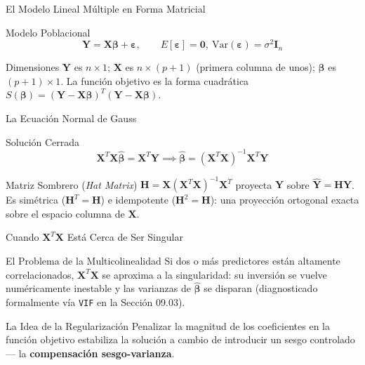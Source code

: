 \documentclass[10pt, aspectratio=169]{beamer}
\begin{document}
\begin{frame}{El Modelo Lineal Múltiple en Forma Matricial}
  \footnotesize
  \begin{block}{Modelo Poblacional}
    $$\mathbf{Y}=\mathbf{X}\boldsymbol\beta+\boldsymbol\varepsilon, \qquad E[\boldsymbol\varepsilon]=\mathbf{0},\ \text{Var}(\boldsymbol\varepsilon)=\sigma^2\mathbf{I}_n$$
  \end{block}
  \pause

  \vspace{0.1cm}
  \begin{alertblock}{Dimensiones}
    $\mathbf{Y}$ es $n\times1$; $\mathbf{X}$ es $n\times(p+1)$ (primera columna de unos); $\boldsymbol\beta$ es $(p+1)\times1$. La función objetivo es la forma cuadrática $S(\boldsymbol\beta)=(\mathbf{Y}-\mathbf{X}\boldsymbol\beta)^T(\mathbf{Y}-\mathbf{X}\boldsymbol\beta)$.
  \end{alertblock}
\end{frame}

\begin{frame}{La Ecuación Normal de Gauss}
  \footnotesize
  \begin{block}{Solución Cerrada}
    $$\mathbf{X}^T\mathbf{X}\hat{\boldsymbol\beta}=\mathbf{X}^T\mathbf{Y} \implies \hat{\boldsymbol\beta}=(\mathbf{X}^T\mathbf{X})^{-1}\mathbf{X}^T\mathbf{Y}$$
  \end{block}
  \pause

  \vspace{0.1cm}
  \begin{alertblock}{Matriz Sombrero (\emph{Hat Matrix})}
    $\mathbf{H}=\mathbf{X}(\mathbf{X}^T\mathbf{X})^{-1}\mathbf{X}^T$ proyecta $\mathbf{Y}$ sobre $\hat{\mathbf{Y}}=\mathbf{H}\mathbf{Y}$. Es simétrica ($\mathbf{H}^T=\mathbf{H}$) e idempotente ($\mathbf{H}^2=\mathbf{H}$): una proyección ortogonal exacta sobre el espacio columna de $\mathbf{X}$.
  \end{alertblock}
\end{frame}

\begin{frame}{Cuando $\mathbf{X}^T\mathbf{X}$ Está Cerca de Ser Singular}
  \footnotesize
  \begin{block}{El Problema de la Multicolinealidad}
    Si dos o más predictores están altamente correlacionados, $\mathbf{X}^T\mathbf{X}$ se aproxima a la singularidad: su inversión se vuelve numéricamente inestable y las varianzas de $\hat{\boldsymbol\beta}$ se disparan (diagnosticado formalmente vía \texttt{VIF} en la Sección 09.03).
  \end{block}
  \pause

  \vspace{0.1cm}
  \begin{alertblock}{La Idea de la Regularización}
    Penalizar la magnitud de los coeficientes en la función objetivo estabiliza la solución a cambio de introducir un sesgo controlado --- la \textbf{compensación sesgo-varianza}.
  \end{alertblock}
\end{frame}
\end{document}
